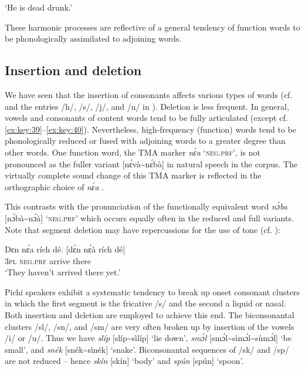 \glt ‘He is dead drunk.’
\z

These harmonic processes are reflective of a general tendency of function words to be phonologically assimilated to adjoining words. 

\subsection{Insertion and deletion}\label{sec:2.5.4}

We have seen that the insertion of consonants affects various types of words (cf.  and the entries /h/, /s/, /j/, and /n/ in ). Deletion is less frequent. In general, vowels and consonants of content words tend to be fully articulated (except cf. \ref{ex:key:39}–\ref{ex:key:40}). Nevertheless, high-frequency (function) words tend to be phonologically reduced or fused with adjoining words to a greater degree than other words. One function word, the TMA marker \textit{nɛ́a} ‘\textsc{neg.prf}’, is not pronounced as the fuller variant [nɛ́và{\textasciitilde}nɛ́bà] in natural speech in the corpus. The virtually complete sound change of this TMA marker is reflected in the orthographic choice of \textit{nɛ́a} . 


This contrasts with the pronunciation of the functionally equivalent word \textit{nɔ́ba} [nɔ́bà{\textasciitilde}nɔ́à] ‘\textsc{neg}.\textsc{prf}’ which occurs equally often in the reduced and full variants. Note that segment deletion may have repercussions for the use of tone (cf. ): 



\ea%
    \label{ex:key:38}
    \gll   Dɛn    nɛ́a    rích    dé.        [dɛ̀n    nɛ́à    rích    dé]\\
\textsc{3pl}    \textsc{neg}.\textsc{prf}  arrive  there\\

\glt ‘They haven’t arrived there yet.’
\z

Pichi speakers exhibit a systematic tendency to break up onset consonant clusters in which the first segment is the fricative /s/ and the second a liquid or nasal. Both insertion and deletion are employed to achieve this end. The biconsonantal clusters /sl/, /sn/, and /sm/ are very often broken up by insertion of the vowels /i/ or /u/. Thus we have \textit{slíp} [slíp{\textasciitilde}sìlíp] ‘lie down’, \textit{smɔ́l} [smɔ́l{\textasciitilde}sìmɔ́l{\textasciitilde}sùmɔ́l] ‘be small’, and \textit{snék} [snék{\textasciitilde}sìnék] ‘snake’. Biconsonantal sequences of /sk/ and /sp/ are not reduced – hence \textit{skín} [skín] ‘body’ and \textit{spún} [spún] ‘spoon’. 



